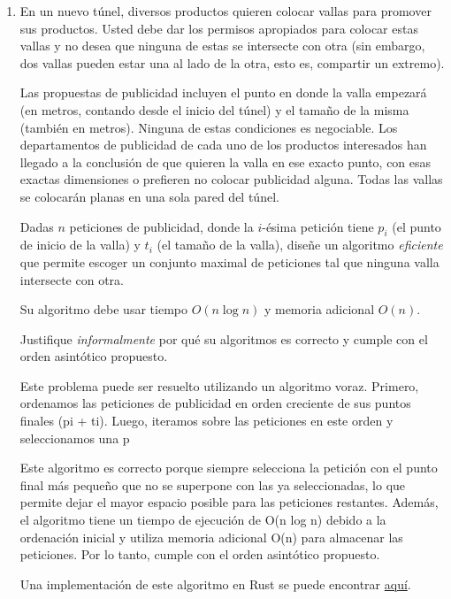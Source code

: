 \documentclass[letterpaper, 12pt]{article}
\begin{document}
\begin{enumerate}


\item  En un nuevo túnel, diversos productos quieren colocar vallas para promover sus productos. Usted debe dar los permisos apropiados para colocar estas vallas y no desea que ninguna de estas se intersecte con otra (sin embargo, dos vallas pueden estar una al lado de la otra, esto es, compartir un extremo).

Las propuestas de publicidad incluyen el punto en donde la valla empezará (en metros, contando desde el inicio del túnel) y el tamaño de la misma (también en metros). Ninguna de estas condiciones es negociable. Los departamentos de publicidad de cada uno de los productos interesados han llegado a la conclusión de que quieren la valla en ese exacto punto, con esas exactas dimensiones o prefieren no colocar publicidad alguna. Todas las vallas se colocarán planas en una sola pared del túnel.

Dadas $n$ peticiones de publicidad, donde la $i$-ésima petición tiene $p_i$ (el punto de inicio de la valla) y $t_i$ (el tamaño de la valla), diseñe un algoritmo \emph{eficiente} que permite escoger un conjunto maximal de peticiones tal que ninguna valla intersecte con otra.

Su algoritmo debe usar tiempo $O(n\log n)$ y memoria adicional $O(n)$.

Justifique \emph{informalmente} por qué su algoritmos es correcto y cumple con el orden asintótico propuesto.

Este problema puede ser resuelto utilizando un algoritmo voraz. Primero, ordenamos las peticiones de publicidad en orden creciente de sus puntos finales (pi + ti). Luego, iteramos sobre las peticiones en este orden y seleccionamos una p

Este algoritmo es correcto porque siempre selecciona la petición con el punto final más pequeño que no se superpone con las ya seleccionadas, lo que permite dejar el mayor espacio posible para las peticiones restantes. Además, el algoritmo tiene un tiempo de ejecución de O(n log n) debido a la ordenación inicial y utiliza memoria adicional O(n) para almacenar las peticiones. Por lo tanto, cumple con el orden asintótico propuesto.

Una implementación de este algoritmo en Rust se puede encontrar \href{https://gitfront.io/r/chrischriscris/swaWSXShzVoW/Tareas-CI5651-EM2024/tree/tarea2/ej1/}{aquí}.


\end{enumerate}
\end{document}
